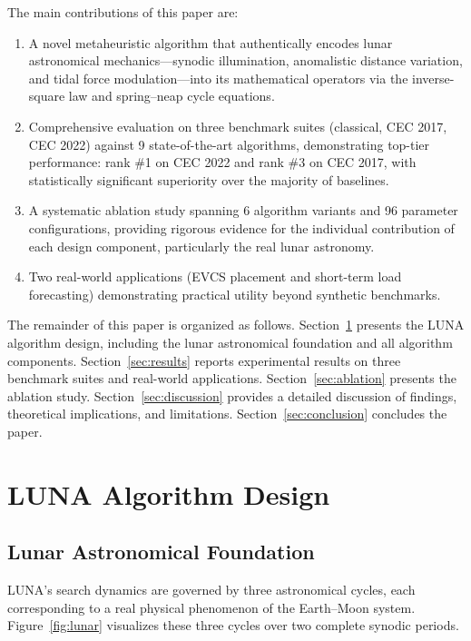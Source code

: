 \documentclass[11pt,a4paper]{article}
\begin{document}
The main contributions of this paper are:
\begin{enumerate}[leftmargin=1.5em]
\item A novel metaheuristic algorithm that authentically encodes lunar astronomical mechanics---synodic illumination, anomalistic distance variation, and tidal force modulation---into its mathematical operators via the inverse-square law and spring--neap cycle equations.
\item Comprehensive evaluation on three benchmark suites (classical, CEC 2017, CEC 2022) against 9 state-of-the-art algorithms, demonstrating top-tier performance: rank \#1 on CEC 2022 and rank \#3 on CEC 2017, with statistically significant superiority over the majority of baselines.
\item A systematic ablation study spanning 6 algorithm variants and 96 parameter configurations, providing rigorous evidence for the individual contribution of each design component, particularly the real lunar astronomy.
\item Two real-world applications (EVCS placement and short-term load forecasting) demonstrating practical utility beyond synthetic benchmarks.
\end{enumerate}

The remainder of this paper is organized as follows. Section~\ref{sec:design} presents the LUNA algorithm design, including the lunar astronomical foundation and all algorithm components. Section~\ref{sec:results} reports experimental results on three benchmark suites and real-world applications. Section~\ref{sec:ablation} presents the ablation study. Section~\ref{sec:discussion} provides a detailed discussion of findings, theoretical implications, and limitations. Section~\ref{sec:conclusion} concludes the paper.

\section{LUNA Algorithm Design}\label{sec:design}

\subsection{Lunar Astronomical Foundation}

LUNA's search dynamics are governed by three astronomical cycles, each corresponding to a real physical phenomenon of the Earth--Moon system. Figure~\ref{fig:lunar} visualizes these three cycles over two complete synodic periods.
\end{document}
